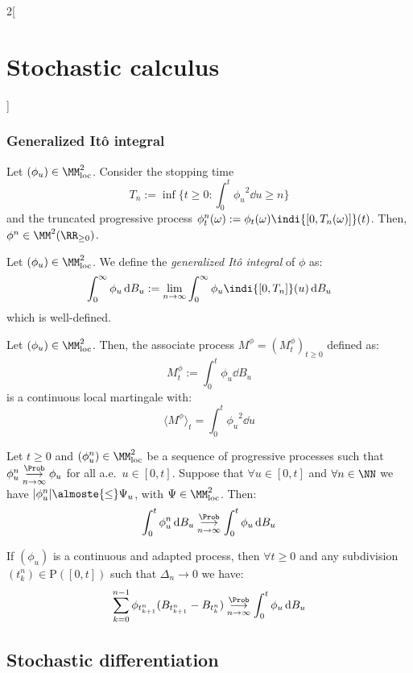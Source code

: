 \documentclass[../../../main_math.tex]{subfiles}
\begin{document}
\begin{multicols}{2}[\section{Stochastic calculus}]
  \subsubsection{Generalized Itô integral}
  \begin{proposition}
    Let $(\phi_u)\in \MM^2_{\text{loc}}$. Consider the stopping time
    $$
      T_n:=\inf\{t\geq 0:\int_0^t{\phi_u}^2\dd{u}\geq n\}
    $$
    and the truncated progressive process $\phi^n_t(\omega):=\phi_t(\omega)\indi{[0,T_n(\omega)]}(t)$. Then, $\phi^n\in\MM^2(\RR_{\geq 0})$.
  \end{proposition}
  \begin{definition}
    Let $(\phi_u)\in \MM^2_{\text{loc}}$. We define the \emph{generalized Itô integral} of $\phi$ as:
    $$
      \int_0^\infty \phi_u\dd{B_u}:=\lim_{n\to\infty}\int_0^\infty \phi_u \indi{[0,T_n]}(u)\dd{B_u}
    $$
    which is well-defined.
  \end{definition}
  \begin{theorem}
    Let $(\phi_u)\in \MM^2_{\text{loc}}$. Then, the associate process $M^\phi={(M_t^\phi)}_{t\geq 0}$ defined as:
    $$
      M_t^\phi:=\int_0^t \phi_u\dd{B_u}
    $$
    is a continuous local martingale with:
    $$
      {\langle M^\phi\rangle}_t=\int_0^t{\phi_u}^2\dd{u}
    $$
  \end{theorem}
  \begin{theorem}\label{SC:stochastic_dominated}
    Let $t\geq 0$ and $(\phi_u^n)\in \MM^2_{\text{loc}}$ be a sequence of progressive processes such that $\phi_u^n\overset{\Prob}{\underset{n\to\infty}{\longrightarrow}} \phi_u$ for all a.e.\ $u\in[0,t]$. Suppose that $\forall u\in [0,t]$ and $\forall n\in\NN$ we have $\abs{\phi_u^n}\almoste{\leq} \Psi_u$, with $\Psi\in\MM^2_{\text{loc}}$. Then:
    $$
      \int_0^t \phi_u^n\dd{B_u}\overset{\Prob}{\underset{n\to\infty}{\longrightarrow}} \int_0^t \phi_u\dd{B_u}
    $$
  \end{theorem}
  \begin{corollary}
    If $(\phi_u)$ is a continuous and adapted process, then $\forall t\geq 0$ and any subdivision $(t_k^n)\in \mathrm{P}([0,t])$ such that $\Delta_n\to 0$ we have:
    $$
      \sum_{k=0}^{n-1}\phi_{t_{k+1}^n}(B_{t_{k+1}^n}-B_{t_k^n})\overset{\Prob}{\underset{n\to\infty}{\longrightarrow}} \int_0^t \phi_u\dd{B_u}
    $$
  \end{corollary}
  \subsection{Stochastic differentiation}

\end{multicols}
\end{document}
